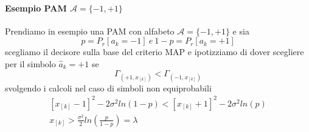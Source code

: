            \paragraph{Esempio PAM $\mathcal{A} = \{-1,+1\}$}{
                Prendiamo in esempio una PAM con alfabeto $\mathcal{A} = \{-1,+1\}$ e sia 
                \[
                    p=P_r[a_k=-1]\ e\ 1-p=P_r[a_k=+1]
                \]
                scegliamo il decisore sulla base del criterio MAP e ipotizziamo di dover scegliere per il simbolo $\hat{a}_k =+1$ se
                \[
                    \Gamma_{(+1,x_{[k]})} < \Gamma_{(-1,x_{[k]})} 
                \]  
                svolgendo i calcoli nel caso di simboli non equiprobabili
                \begin{gather}
                    \left[x_{[k]}-1\right]^2-2\sigma^2ln(1-p)<\left[x_{[k]}+1\right]^2-2\sigma^2ln(p)\nonumber \\
                    x_{[k]}> \frac{\sigma^2}{2}ln\left(\frac{p}{1-p}\right) = \lambda\nonumber
                \end{gather}
                \begin{figure}[H]
                    \centering
\end{figure}}
